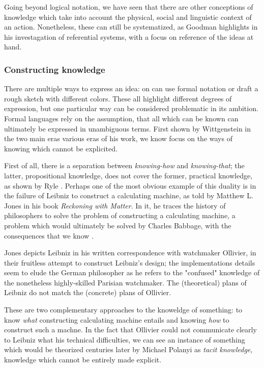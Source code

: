 Going beyond logical notation, we have seen that there are other conceptions of knowledge which take into account the physical, social and linguistic context of an action. Nonetheless, these can still be systematized, as Goodman highlights in his investagation of referential systems, with a focus on reference of the ideas at hand.

\subsubsection{Constructing knowledge}

There are multiple ways to express an idea: on can use formal notation or draft a rough sketch with different colors. These all highlight different degrees of expression, but one particular way can be considered problematic in its ambition. Formal languages rely on the assumption, that all which can be known can ultimately be expressed in unambiguous terms. First shown by Wittgenstein in the two main eras various eras of his work, we know focus on the ways of knowing which cannot be explicited.

First of all, there is a separation between \emph{knowing-how} and \emph{knowing-that}; the latter, propositional knowledge, does not cover the former, practical knowledge, as shown by Ryle \citep{ryle_concept_1951}. Perhaps one of the most obvious example of this duality is in the failure of Leibniz to construct a calculating machine, as told by Matthew L. Jones in his book \emph{Reckoning with Matter}. In it, he traces the history of philosophers to solve the problem of constructing a calculating machine, a problem which would ultimately be solved by Charles Babbage, with the consequences that we know \citep{jones_reckoning_2016}.

Jones depicts Leibniz in his written correspondence with watchmaker Ollivier, in their fruitless attempt to construct Leibniz's design; the implementations details seem to elude the German philosopher as he refers to the "confused" knowledge of the nonetheless highly-skilled Parisian watchmaker. The (theoretical) plans of Leibniz do not match the (concrete) plans of Ollivier.

These are two complementary approaches to the knoweldge of something: to know \emph{what} constructing calculating machine entails and knowing \emph{how} to construct such a machne. In the fact that Ollivier could not communicate clearly to Leibniz what his technical difficulties, we can see an instance of something which would be theorized centuries later by Michael Polanyi as \emph{tacit knowledge}, knowledge which cannot be entirely made explicit.

